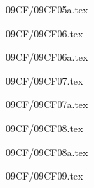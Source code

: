 \documentclass[9pt, xcolor={svgnames, x11names},professionalfonts]{beamer}
\def\scale{1}
\begin{document}

\begin{frame}{09CF/09CF05a.tex}
	
\end{frame}


\begin{frame}{09CF/09CF06.tex}
	
\end{frame}


\begin{frame}{09CF/09CF06a.tex}
	
\end{frame}


\begin{frame}{09CF/09CF07.tex}
	
\end{frame}


\begin{frame}{09CF/09CF07a.tex}
	
\end{frame}


\begin{frame}{09CF/09CF08.tex}
	
\end{frame}


\begin{frame}{09CF/09CF08a.tex}
	
\end{frame}


\begin{frame}{09CF/09CF09.tex}
	
\end{frame}
\end{document}
